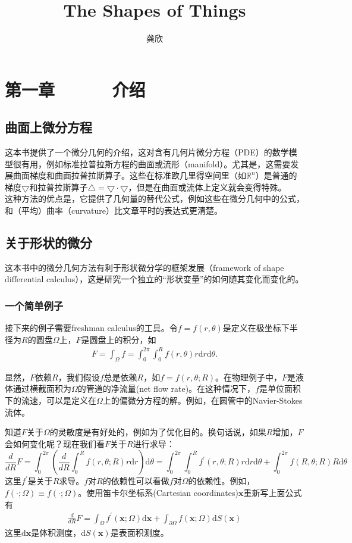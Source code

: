 \documentclass[12pt,a4paper]{article}
\title{The Shapes of Things}
\author{龚欣}
\date{\chntoday}
\numberwithin{equation}{section}
\begin{document}
\maketitle

\section{第一章~~~~~~介绍}
\subsection{曲面上微分方程}
这本书提供了一个微分几何的介绍，这对含有几何片微分方程（PDE）的数学模型很有用，例如标准拉普拉斯方程的曲面或流形（manifold）。尤其是，这需要发展曲面梯度和曲面拉普拉斯算子。这些在标准欧几里得空间里（如$\mathbb{R}^n$）是普通的梯度$\bigtriangledown$和拉普拉斯算子$\bigtriangleup=\bigtriangledown \cdot \bigtriangledown$，但是在曲面或流体上定义就会变得特殊。\\

这种方法的优点是，它提供了几何量的替代公式，例如这些在微分几何中的公式，和（平均）曲率（curvature）比文章平时的表达式更清楚。

\subsection{关于形状的微分}
这本书中的微分几何方法有利于形状微分学的框架发展（framework of shape differential calculus），这是研究一个独立的“形状变量”的如何随其变化而变化的。

\subsubsection{一个简单例子}
接下来的例子需要freshman calculus的工具。令$f=f(r,\theta)$是定义在极坐标下半径为$R$的圆盘$\Omega$上，$F$是圆盘上的积分，如
\begin{gather}
F=\int_{\Omega} f=\int_{0}^{2\pi}\int_{0}^{R} f(r,\theta)r\mathrm{d}r\mathrm{d}\theta.
\end{gather}

显然，$F$依赖$R$，我们假设$f$总是依赖$R$，如$f=f(r,\theta;R)$。在物理例子中，$F$是液体通过横截面积为$\Omega$的管道的净流量(net flow rate)。在这种情况下，$f$是单位面积下的流速，可以是定义在$\Omega$上的偏微分方程的解。例如，在圆管中的Navier-Stokes流体。

知道$F$关于$\Omega$的灵敏度是有好处的，例如为了优化目的。换句话说，如果$R$增加，$F$会如何变化呢？现在我们看$F$关于$R$进行求导：
$$\frac{d}{dR}F=\int_{0}^{2\pi}\left( \frac{d}{dR}\int_{0}^{R}f(r,\theta;R)r\mathrm{d}r \right)\mathrm{d}\theta =\int_{0}^{2\pi}\int_{0}^{R}f^{'}(r,\theta;R)r\mathrm{d}r\mathrm{d}\theta + \int_{0}^{2\pi}f(R,\theta;R)R\mathrm{d}\theta$$
这里$f^{'}$是关于$R$求导。$f$对$R$的依赖性可以看做$f$对$\Omega$的依赖性。例如，$f(\cdot;\Omega)\equiv f(\cdot;\Omega)$。使用笛卡尔坐标系(Cartesian coordinates)$\mathbf{x}$重新写上面公式有
\begin{gather}
\frac{d}{dR}F=\int_{\Omega}f^{'}(\mathbf{x};\Omega)\mathrm{d}\mathbf{x} + \int_{\partial \Omega}f(\mathbf{x};\Omega)\mathrm{d}S(\mathbf{x})
\end{gather}
这里$\mathrm{d}\mathbf{x}$是体积测度，$\mathrm{d}S(\mathbf{x})$是表面积测度。
\end{document}

